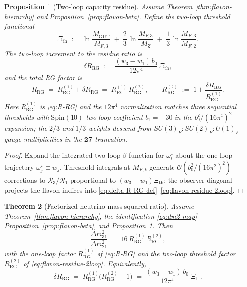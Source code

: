 \documentclass[11pt]{article}
\theoremstyle{plain}
\newtheorem{theorem}{Theorem}[section]
\newtheorem{proposition}[theorem]{Proposition}
\theoremstyle{definition}
\theoremstyle{remark}
\numberwithin{equation}{section}
\newcommand{\Spin}{\mathrm{Spin}}
\begin{document}
\begin{proposition}[Two-loop capacity residue]
\label{prop:flavon-beta-2loop}
Assume Theorem~\ref{thm:flavon-hierarchy} and Proposition~\ref{prop:flavon-beta}.
Define the two-loop threshold functional
\begin{equation}\label{eq:Xi-th}
  \Xi_{\mathrm{th}}
  \;:=\;
  \ln\!\frac{M_{\mathrm{GUT}}}{M_{F,3}}
  \;+\;
  \frac{2}{3}\,\ln\!\frac{M_{F,3}}{M_Z}
  \;+\;
  \frac{1}{3}\,\ln\!\frac{M_{F,3}}{M_{F,2}}.
\end{equation}
The two-loop increment to the residue \emph{ratio} is
\begin{equation}\label{eq:delta-R-RG-def}
  \delta R_{\mathrm{RG}}
  \;:=\;
  \frac{(w_3-w_1)\,b_0}{12\pi^4}\,\Xi_{\mathrm{th}},
\end{equation}
and the total RG factor is
\begin{equation}\label{eq:flavon-residue-2loop}
  R_{\mathrm{RG}}
  \;=\;
  R_{\mathrm{RG}}^{(1)} + \delta R_{\mathrm{RG}}
  \;=\;
  R_{\mathrm{RG}}^{(1)}\,R_{\mathrm{RG}}^{(2)},
  \qquad
  R_{\mathrm{RG}}^{(2)}
  \;:=\;
  1 + \frac{\delta R_{\mathrm{RG}}}{R_{\mathrm{RG}}^{(1)}}.
\end{equation}
Here $R_{\mathrm{RG}}^{(1)}$ is \eqref{eq:R-RG} and the $12\pi^4$ normalization
matches three sequential thresholds with $\Spin(10)$ two-loop coefficient
$b_1=-30$ in the $b_0^2/(16\pi^2)^2$ expansion; the $2/3$ and $1/3$ weights
descend from $SU(3)_F:SU(2)_F:U(1)_F$ gauge multiplicities in the
$\mathbf{27}$ truncation.
\end{proposition}

\begin{proof}
Expand the integrated two-loop $\beta$-function for $\omega^\star_\iota$ about
the one-loop trajectory $\omega^\star_j\equiv w_j$. Threshold integrals at
$M_{F,k}$ generate $\mathcal{O}(b_0^2/(16\pi^2)^2)$ corrections to
$\mathcal{R}_3/\mathcal{R}_1$ proportional to $(w_3-w_1)\Xi_{\mathrm{th}}$;
the observer diagonal projects the flavon indices into
\eqref{eq:delta-R-RG-def}--\eqref{eq:flavon-residue-2loop}.
\end{proof}

\begin{theorem}[Factorized neutrino mass-squared ratio]
\label{thm:nu-ratio-2loop}
Assume Theorem~\ref{thm:flavon-hierarchy}, the identification \eqref{eq:dm2-map},
Proposition~\ref{prop:flavon-beta}, and Proposition~\ref{prop:flavon-beta-2loop}.
Then
\begin{equation}\label{eq:nu-ratio-factorized}
  \frac{\Delta m^2_{31}}{\Delta m^2_{21}}
  \;=\;
  16\,R_{\mathrm{RG}}^{(1)}\,R_{\mathrm{RG}}^{(2)},
\end{equation}
with the one-loop factor $R_{\mathrm{RG}}^{(1)}$ of \eqref{eq:R-RG} and
the two-loop threshold factor $R_{\mathrm{RG}}^{(2)}$ of
\eqref{eq:flavon-residue-2loop}. Equivalently,
\begin{equation}\label{eq:R-RG-total}
  \delta R_{\mathrm{RG}}
  \;=\;
  R_{\mathrm{RG}}^{(1)}\bigl(R_{\mathrm{RG}}^{(2)}-1\bigr)
  \;=\;
  \frac{(w_3-w_1)\,b_0}{12\pi^4}\,\Xi_{\mathrm{th}}.
\end{equation}
\end{theorem}
\end{document}
